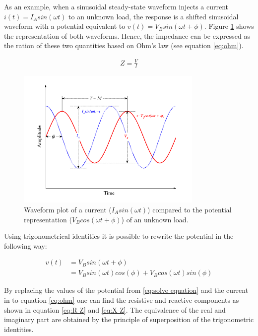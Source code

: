 As an example, when a sinusoidal steady-state waveform injects a current $i(t) = I_A sin(\omega t)$ to an unknown load, the response is a shifted sinusoidal waveform with a potential equivalent to $v(t) = V_B sin(\omega t + \phi)$. Figure \ref{fig:impedance wave} shows the representation of both waveforms. Hence, the impedance can be expressed as the ration of these two quantities based on Ohm's law (see equation \ref{eq:ohm}).

\begin{align}
	\label{eq:ohm}
	Z = \frac{V}{I}
\end{align}


\begin{figure}[!htpb]
	\centering
	\includegraphics[width=0.8\textwidth,keepaspectratio, trim={0cm 0cm 0cm 0cm},clip]{figure_1}    
	\caption[Impedance waveforms]{Waveform plot of a current ($I_A sin (\omega t)$) compared to the potential representation ($V_B cos (\omega t + \phi)$) of an unknown load.}
	\label{fig:impedance wave}
\end{figure}

Using trigonometrical identities it is possible to rewrite the potential in the following way:

\begin{equation}
	\label{eq:solve equation}
	\begin{aligned}	
		v(t) & = V_B sin(\omega t + \phi) \\
		     & = V_B sin(\omega t) cos(\phi) + V_B cos(\omega t) sin(\phi)
	\end{aligned}
\end{equation}

By replacing the values of the potential from \ref{eq:solve equation} and the current in to equation \ref{eq:ohm} one can find the resistive and reactive components as shown in equation \ref{eq:R Z} and \ref{eq:X Z}. The equivalence of the real and imaginary part are obtained by the principle of superposition of the trigonometric identities. 

